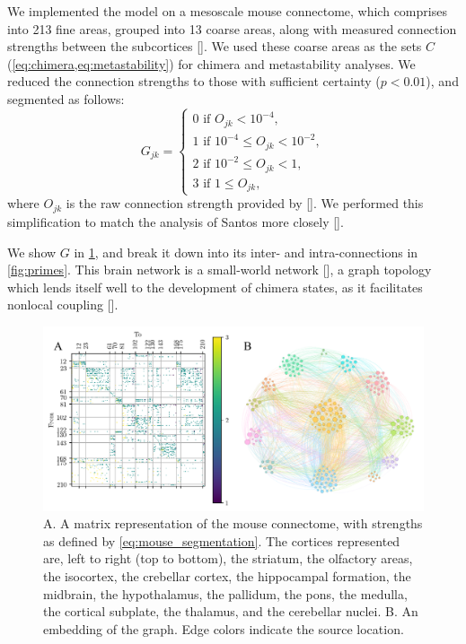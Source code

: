 We implemented the model on a mesoscale mouse connectome,
which comprises into 213 fine areas,
grouped into 13 coarse areas,
along with measured connection strengths between the subcortices [].
We used these coarse areas as the sets $C$ (\cref{eq:chimera,eq:metastability}) for chimera and metastability analyses.
We reduced the connection strengths to those with sufficient certainty ($p < 0.01$), and segmented as follows:
\begin{equation}
  \label{eq:mouse_segmentation}
  G_{j k}
  =
  \begin{cases}
    0 \text{ if } O_{j k} < 10^{-4}, \\
    1 \text{ if } 10^{-4} \leq O_{j k} < 10^{-2}, \\
    2 \text{ if } 10^{-2} \leq O_{j k} < 1, \\
    3 \text{ if } 1 \leq O_{j k},
  \end{cases}
\end{equation}
where $O_{j k}$ is the raw connection strength provided by [].
We performed this simplification to match the analysis of Santos \etal more closely [].

We show $G$ in \cref{fig:mouse_connectome}, and break it down into its inter- and intra-connections in \cref{fig:primes}.
This brain network is a small-world network [],
a graph topology which lends itself well to the development of chimera states, as it facilitates nonlocal coupling [].
\onecolumngrid

\begin{figure}[ht]
  \centering
  \includegraphics[width=\textwidth]{figure/network.pdf}
  \caption[Mouse connectome]{A. A matrix representation of the mouse connectome, with strengths as defined by \cref{eq:mouse_segmentation}.
    The cortices represented are, left to right (top to bottom),
    the striatum,
    the olfactory areas,
    the isocortex,
    the crebellar cortex,
    the hippocampal formation,
    the midbrain,
    the hypothalamus,
    the pallidum,
    the pons,
    the medulla,
    the cortical subplate,
    the thalamus,
    and the cerebellar nuclei.
    B. An embedding of the graph.
    Edge colors indicate the source location.
  }
  \label{fig:mouse_connectome}
\end{figure}
\twocolumngrid

